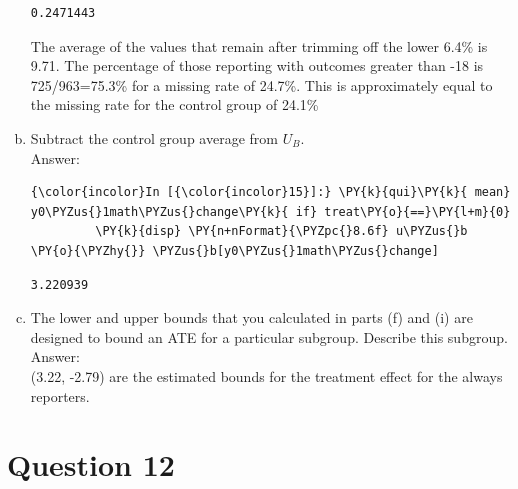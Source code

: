 \documentclass[11pt,notitlepage]{article}\usepackage[]{graphicx}\usepackage[]{color}
\makeatletter
\newenvironment{kframe}{%
 \def\at@end@of@kframe{}%
 \ifinner\ifhmode%
  \def\at@end@of@kframe{\end{minipage}}%
  \begin{minipage}{\columnwidth}%
 \fi\fi%
 \def\FrameCommand##1{\hskip\@totalleftmargin \hskip-\fboxsep
 \colorbox{shadecolor}{##1}\hskip-\fboxsep
     \hskip-\linewidth \hskip-\@totalleftmargin \hskip\columnwidth}%
 \MakeFramed {\advance\hsize-\width
   \@totalleftmargin\z@ \linewidth\hsize
   \@setminipage}}%
 {\par\unskip\endMakeFramed%
 \at@end@of@kframe}
\newenvironment{knitrout}{}{} %
\makeatother
\begin{document}
\begin{enumerate}[a)]
\begin{knitrout}
\begin{kframe}
    \begin{Verbatim}[commandchars=\\\{\}]
0.2471443

    \end{Verbatim}
\end{kframe}
\end{knitrout}

The average of the values that remain after trimming off the lower 6.4\% is 9.71. The percentage of those reporting with outcomes greater than -18 is 725/963=75.3\% for a missing rate of 24.7\%. This is approximately equal to the missing rate for the control group of 24.1\%

\item Subtract the control group average from $U_B$.\\
Answer:\\
\begin{knitrout}
\color{fgcolor}\begin{kframe}
   \begin{Verbatim}[commandchars=\\\{\}]
{\color{incolor}In [{\color{incolor}15}]:} \PY{k}{qui}\PY{k}{ mean} y0\PYZus{}1math\PYZus{}change\PY{k}{ if} treat\PY{o}{==}\PY{l+m}{0} 
         \PY{k}{disp} \PY{n+nFormat}{\PYZpc{}8.6f} u\PYZus{}b \PY{o}{\PYZhy{}} \PYZus{}b[y0\PYZus{}1math\PYZus{}change]
\end{Verbatim}

    \begin{Verbatim}[commandchars=\\\{\}]
3.220939
    \end{Verbatim}
\end{kframe}
\end{knitrout}



\item The lower and upper bounds that you calculated in parts (f) and (i) are designed to bound an ATE for a particular subgroup. Describe this subgroup.\\
Answer:\\
(3.22, -2.79) are the estimated bounds for the treatment effect for the always reporters. 


\end{enumerate}

\section*{Question 12}
\begin{knitrout}
\color{fgcolor}\begin{kframe}
\begin{verbatim}






\end{verbatim}
\end{kframe}
\end{knitrout}
\end{document}
